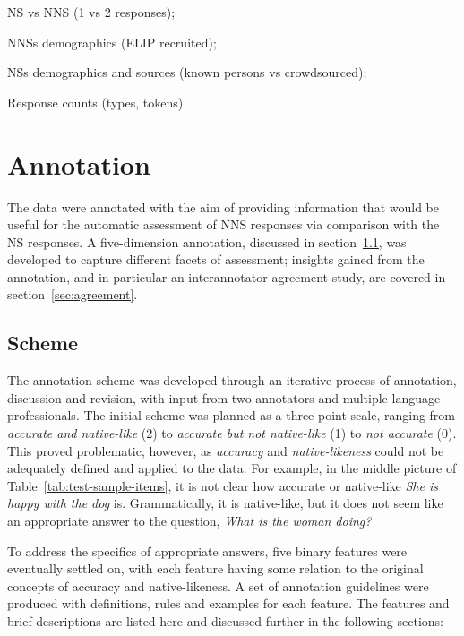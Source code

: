 \documentclass[11pt,a4paper]{article}
\begin{document}
NS vs NNS (1 vs 2 responses); 

NNSs demographics (ELIP recruited); 

NSs demographics and sources (known persons vs crowdsourced);

Response counts (types, tokens)

\section{Annotation}
The data were annotated with the aim of providing information that would be useful for the automatic assessment of NNS responses via comparison with the NS responses.  A five-dimension annotation, discussed in section~\ref{sec:scheme}, was developed to capture different facets of assessment; insights gained from the annotation, and in particular an interannotator agreement study, are covered in section~\ref{sec:agreement}.

\subsection{Scheme}
\label{sec:scheme}
The annotation scheme was developed through an iterative process of annotation, discussion and revision, with input from two annotators and multiple language professionals. The initial scheme was planned as a three-point scale, ranging from \textit{accurate and native-like} (2) to \textit{accurate but not native-like} (1) to \textit{not accurate} (0). This proved problematic, however, as \textit{accuracy} and \textit{native-likeness} could not be adequately defined and applied to the data.
For example, in the middle picture of Table~\ref{tab:test-sample-items}, it is not clear how accurate or native-like \textit{She is happy with the dog} is.  Grammatically, it is native-like, but it does not seem like an appropriate answer to the question, \textit{What is the woman doing?}

To address the specifics of appropriate answers, five binary features were eventually settled on, with each feature having some relation to the original concepts of accuracy and native-likeness. A set of annotation guidelines were produced with definitions, rules and examples for each feature. The features and brief descriptions are listed here and discussed further in the following sections:
\end{document}

